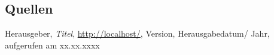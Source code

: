 
\subsection{Quellen}

\begin{thebibliography}{10}

  Herausgeber,
  {\em Titel},
  \url{http://localhost/},
  Version, Herausgabedatum/ Jahr,
  aufgerufen am xx.xx.xxxx

\end{thebibliography}

\clearpage
